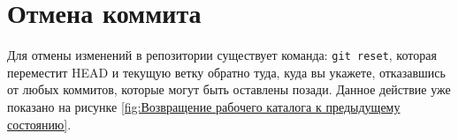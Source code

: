 
\section{Отмена коммита}
Для отмены изменений в репозитории существует команда: \texttt{git~reset},
которая переместит HEAD и текущую ветку обратно туда, куда вы укажете,
отказавшись от любых коммитов, которые могут быть оставлены позади.
Данное действие уже показано на рисунке \ref{fig:Возвращение рабочего каталога к предыдущему состоянию}.